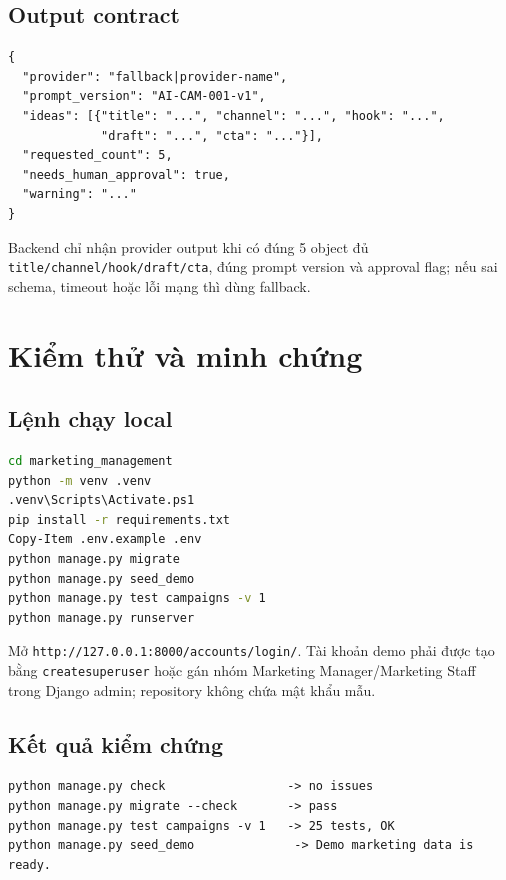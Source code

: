 \documentclass[12pt,a4paper]{article}
\newcommand{\code}[1]{\texttt{\small #1}}
\begin{document}
\subsection{Output contract}
\begin{lstlisting}
{
  "provider": "fallback|provider-name",
  "prompt_version": "AI-CAM-001-v1",
  "ideas": [{"title": "...", "channel": "...", "hook": "...",
             "draft": "...", "cta": "..."}],
  "requested_count": 5,
  "needs_human_approval": true,
  "warning": "..."
}
\end{lstlisting}
Backend chỉ nhận provider output khi có đúng 5 object đủ
\code{title/channel/hook/draft/cta}, đúng prompt version và approval flag; nếu
sai schema, timeout hoặc lỗi mạng thì dùng fallback.

\section{Kiểm thử và minh chứng}
\subsection{Lệnh chạy local}
\begin{lstlisting}[language={bash}]
cd marketing_management
python -m venv .venv
.venv\Scripts\Activate.ps1
pip install -r requirements.txt
Copy-Item .env.example .env
python manage.py migrate
python manage.py seed_demo
python manage.py test campaigns -v 1
python manage.py runserver
\end{lstlisting}

Mở \code{http://127.0.0.1:8000/accounts/login/}. Tài khoản demo phải được tạo
bằng \code{createsuperuser} hoặc gán nhóm Marketing Manager/Marketing Staff
trong Django admin; repository không chứa mật khẩu mẫu.

\subsection{Kết quả kiểm chứng}
\begin{lstlisting}
python manage.py check                 -> no issues
python manage.py migrate --check       -> pass
python manage.py test campaigns -v 1   -> 25 tests, OK
python manage.py seed_demo              -> Demo marketing data is ready.
\end{lstlisting}
\end{document}
